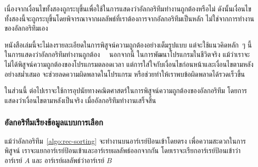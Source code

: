 เนื่องจาก{\wbr}เงื่อนไข{\wbr}ทั้ง{\wbr}สอง{\wbr}ถูก{\wbr}ระบุ{\wbr}ขึ้น{\wbr}เพื่อ{\wbr}ใช้{\wbr}ใน{\wbr}การ{\wbr}แสดง{\wbr}ว่า{\wbr}อัล{\wbr}กอ{\wbr}ริ{\wbr}ทึม{\wbr}ทำงาน{\wbr}ถูกต้อง{\wbr}หรือ{\wbr}ไม่{\wbr}
ดังนั้น{\wbr}เงื่อนไข{\wbr}ทั้ง{\wbr}สอง{\wbr}นี้{\wbr}จะ{\wbr}ถูก{\wbr}ระบุ{\wbr}ขึ้น{\wbr}โดย{\wbr}พิจารณา{\wbr}จาก{\wbr}ผลลัพธ์{\wbr}ที่{\wbr}เรา{\wbr}ต้องการ{\wbr}จาก{\wbr}อัล{\wbr}กอ{\wbr}ริ{\wbr}ทึม{\wbr}เป็น{\wbr}หลัก{\wbr}
ไม่{\wbr}ใช่{\wbr}จาก{\wbr}การ{\wbr}ทำงาน{\wbr}ของ{\wbr}อัล{\wbr}กอ{\wbr}ริ{\wbr}ทึม{\wbr}เอง{\wbr}

หนังสือ{\wbr}เล่ม{\wbr}นี้{\wbr}จะ{\wbr}ไม่{\wbr}ลง{\wbr}รายละเอียด{\wbr}ใน{\wbr}การ{\wbr}พิสูจน์{\wbr}ความ{\wbr}ถูกต้อง{\wbr}อย่าง{\wbr}เต็ม{\wbr}รูปแบบ{\wbr}
แต่{\wbr}จะ{\wbr}ใช้{\wbr}แนว{\wbr}คิด{\wbr}หลัก~ๆ นี้{\wbr}ใน{\wbr}การ{\wbr}แสดง{\wbr}ว่า{\wbr}อัล{\wbr}กอ{\wbr}ริ{\wbr}ทึม{\wbr}ทำงาน{\wbr}ถูกต้อง \ \ นอกจากนี้{\wbr}
ใน{\wbr}การ{\wbr}พัฒนา{\wbr}โปรแกรม{\wbr}ใน{\wbr}ชีวิต{\wbr}จริง แม้ว่า{\wbr}เรา{\wbr}จะ{\wbr}ไม่{\wbr}ได้{\wbr}พิสูจน์{\wbr}ความ{\wbr}ถูกต้อง{\wbr}ของ{\wbr}โปรแกรม{\wbr}ตลอดเวลา{\wbr}
แต่{\wbr}การ{\wbr}ใส่ใจ{\wbr}กับ{\wbr}เงื่อนไข{\wbr}ก่อนหน้า{\wbr}และ{\wbr}เงื่อนไข{\wbr}ตาม{\wbr}หลัง{\wbr}อย่าง{\wbr}สม่ำเสมอ{\wbr}
จะ{\wbr}ช่วย{\wbr}ลด{\wbr}ความผิด{\wbr}พลาด{\wbr}ใน{\wbr}โปรแกรม หรือ{\wbr}ช่วย{\wbr}ทำ{\wbr}ให้{\wbr}เรา{\wbr}พบ{\wbr}ข้อผิดพลาด{\wbr}ได้{\wbr}รวดเร็ว{\wbr}ขึ้น{\wbr}

ใน{\wbr}ส่วน{\wbr}นี้ ต่อไป{\wbr}เรา{\wbr}จะ{\wbr}ใช้{\wbr}การ{\wbr}อุปนัย{\wbr}ทาง{\wbr}คณิตศาสตร์{\wbr}ใน{\wbr}การ{\wbr}พิสูจน์{\wbr}ความ{\wbr}ถูกต้อง{\wbr}ของ{\wbr}อัล{\wbr}กอ{\wbr}ริ{\wbr}ทึม{\wbr}
โดย{\wbr}การ{\wbr}แสดง{\wbr}ว่า{\wbr}เงื่อนไข{\wbr}ตาม{\wbr}หลัง{\wbr}เป็นจริง เมื่อ{\wbr}อัล{\wbr}กอ{\wbr}ริ{\wbr}ทึม{\wbr}ทำงาน{\wbr}เสร็จสิ้น{\wbr}

\subsubsection{อัล{\wbr}กอ{\wbr}ริ{\wbr}ทึม{\wbr}เรียง{\wbr}ข้อมูล{\wbr}แบบ{\wbr}การ{\wbr}เลือก}

แม้ว่า{\wbr}อัล{\wbr}กอ{\wbr}ริ{\wbr}ทึม~\ref{algo:rec-sorting} จะ{\wbr}ทำงาน{\wbr}บน{\wbr}อาร์เรย์{\wbr}ป้อน{\wbr}เข้า{\wbr}โดย{\wbr}ตรง{\wbr}
เพื่อ{\wbr}ความ{\wbr}สะดวก{\wbr}ใน{\wbr}การ{\wbr}พิสูจน์ เรา{\wbr}จะ{\wbr}แยก{\wbr}อาร์เรย์{\wbr}ป้อน{\wbr}เข้า{\wbr}และ{\wbr}อาร์เรย{\wbr}ผลลัพธ์{\wbr}ออก{\wbr}จาก{\wbr}กัน{\wbr}
โดย{\wbr}เรา{\wbr}จะ{\wbr}เรียก{\wbr}อาร์เรย์{\wbr}ป้อน{\wbr}เข้าว่า{\wbr}อาร์เรย์ $A$ และ อาร์เรย์ผลลัพธ์{\wbr}ว่า{\wbr}อาร์เรย์ $B$

